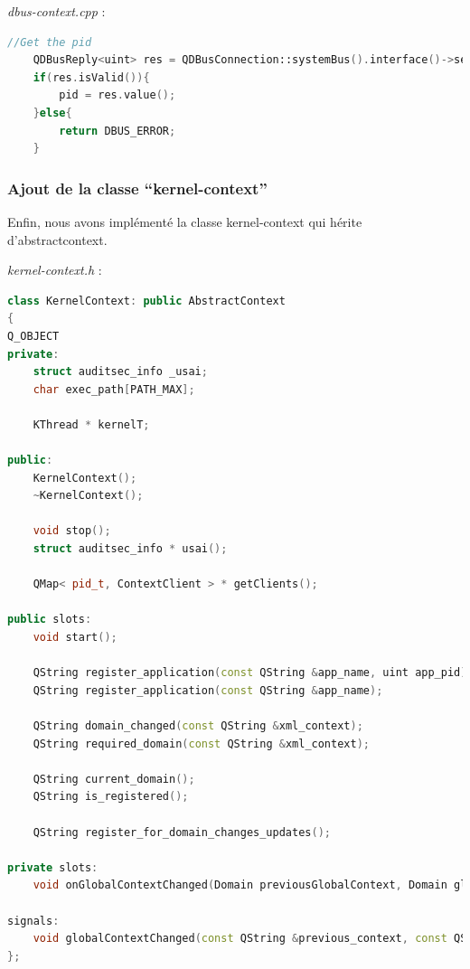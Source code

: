 \documentclass[pdftex,a4paper,titlepage,11pt]{article}
\begin{document}
\textit{dbus-context.cpp} : 
\begin{lstlisting}[language=C++]
	//Get the pid
	QDBusReply<uint> res = QDBusConnection::systemBus().interface()->servicePid(dbus_id);
	if(res.isValid()){
		pid = res.value();
	}else{
		return DBUS_ERROR;
	}
\end{lstlisting}

\subsubsection{Ajout de la classe ``kernel-context''}

Enfin, nous avons implémenté la classe kernel-context qui hérite d'abstractcontext.

\textit{kernel-context.h} : 
\begin{lstlisting}[language=C++]
class KernelContext: public AbstractContext
{
Q_OBJECT
private:
	struct auditsec_info _usai;
	char exec_path[PATH_MAX];

	KThread * kernelT;

public:
	KernelContext();
    ~KernelContext();

	void stop();
	struct auditsec_info * usai();

	QMap< pid_t, ContextClient > * getClients();

public slots:
	void start();

	QString register_application(const QString &app_name, uint app_pid);
	QString register_application(const QString &app_name);

	QString domain_changed(const QString &xml_context);
	QString required_domain(const QString &xml_context);

	QString current_domain();
	QString is_registered();

	QString register_for_domain_changes_updates();

private slots:
	void onGlobalContextChanged(Domain previousGlobalContext, Domain globalContext);

signals:
	void globalContextChanged(const QString &previous_context, const QString &new_context);
};

\end{lstlisting}
\end{document}
